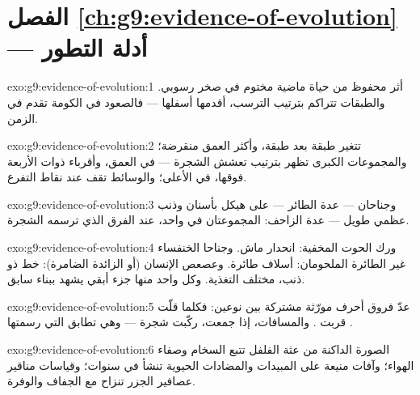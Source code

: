 \section*{الفصل \ref{ch:g9:evidence-of-evolution} --- أدلة التطور}

\begin{solution}{exo:g9:evidence-of-evolution:1}
أثر محفوظ من حياة ماضية مختوم في صخر رسوبي. والطبقات
تتراكم بترتيب الترسب، أقدمها أسفلها --- فالصعود في
الكومة تقدم في الزمن.
\end{solution}

\begin{solution}{exo:g9:evidence-of-evolution:2}
 تتغير طبقة بعد طبقة، وأكثر  العمق
منقرضة؛ والمجموعات الكبرى تظهر بترتيب تعشش الشجرة ---
 في العمق، وأقرباء ذوات  الأربعة فوقها،
  في الأعلى؛ والوسائط تقف عند نقاط
التفرع.
\end{solution}

\begin{solution}{exo:g9:evidence-of-evolution:3}
 وجناحان --- عدة الطائر --- على هيكل بأسنان وذنب
عظمي طويل --- عدة الزاحف: المجموعتان في  واحد، عند
الفرق الذي ترسمه الشجرة.
\end{solution}

\begin{solution}{exo:g9:evidence-of-evolution:4}
 ورك  الحوت المخفية: انحدار ماش. وجناحا الخنفساء
غير الطائرة الملحومان: أسلاف طائرة. وعصعص الإنسان (أو
الزائدة الضامرة): خط ذو ذنب، مختلف التغذية. وكل واحد
منها جزء أبقي يشهد ببناء سابق.
\end{solution}

\begin{solution}{exo:g9:evidence-of-evolution:5}
عدّ فروق أحرف مورّثة مشتركة بين نوعين: فكلما قلّت قربت
. والمسافات، إذا جمعت، ركّبت شجرة --- وهي تطابق
التي رسمتها  .
\end{solution}

\begin{solution}{exo:g9:evidence-of-evolution:6}
الصورة الداكنة من عثة الفلفل تتبع السخام وصفاء الهواء؛
وآفات منيعة على المبيدات والمضادات الحيوية تنشأ في
سنوات؛ وقياسات مناقير عصافير الجزر تنزاح مع الجفاف
والوفرة.
\end{solution}

